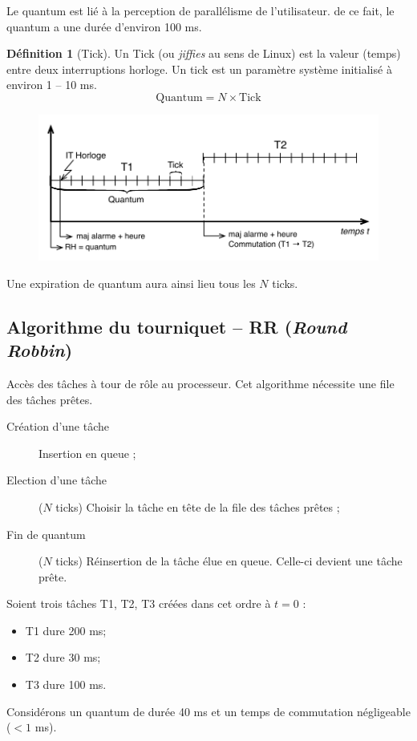 \documentclass[11pt,english,french]{scrreprt}
\theoremstyle{remark}
\theoremstyle{definition}
\newtheorem*{def*}{Définition}
\begin{document}
Le quantum est lié à la perception de parallélisme de l'utilisateur. de ce fait, le quantum a une durée d'environ 100 ms.

\begin{def*}[Tick]
	Un Tick (ou \emph{jiffies} au sens de Linux) est la valeur (temps) entre deux interruptions horloge. Un tick est un paramètre système initialisé à environ 1 -- 10 ms.
	\[\textrm{Quantum} = N\times \textrm{Tick}\]
\end{def*}
\begin{figure}[h!]
	\center
	\vspace{-30pt}
	\includegraphics[scale=.65]{img/tick-quantum}
	\vspace{-20pt}
\end{figure}

Une expiration de quantum aura ainsi lieu tous les $N$ ticks.

\subsection{Algorithme du tourniquet -- RR (\emph{Round Robbin})} %
Accès des tâches à tour de rôle au processeur. Cet algorithme nécessite une file des tâches prêtes.

\begin{description}
	\item [Création d'une tâche] Insertion en queue ;
	\item [Election d'une tâche] ($N$ ticks) Choisir la tâche en tête de la file des tâches prêtes ;
	\item [Fin de quantum] ($N$ ticks) Réinsertion de la tâche élue en queue. Celle-ci devient une tâche prête.
\end{description}

Soient trois tâches T1, T2, T3 créées dans cet ordre à $t=0$ : \begin{itemize}
	\item T1 dure 200 ms;
	\item T2 dure 30 ms;
	\item T3 dure 100 ms.
\end{itemize}
Considérons un quantum de durée 40 ms et un temps de commutation négligeable ($<1$ ms).
\end{document}
